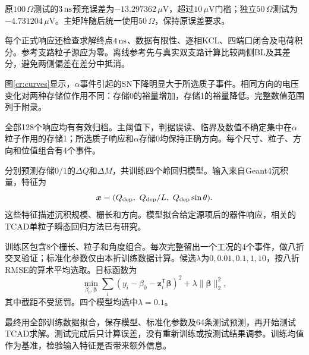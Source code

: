 \documentclass[UTF8,a4paper,zihao=-4,fontset=fandol]{ctexart}
\begin{document}
原$100\,\Omega$测试的$3\,\mathrm{ns}$预充误差为$-13.297362\,\mu\mathrm V$，超过$10\,\mu\mathrm V$门槛；独立$50\,\Omega$测试为$-4.731204\,\mu\mathrm V$。主矩阵随后统一使用$50\,\Omega$，保持原误差要求。

每个正式响应还检查求解终点$4\,\mathrm{ns}$、数据有限性、逐相KCL、四端口闭合及电荷积分。参考支路粒子源应为零。离线参考先与真实双支路计算比较两侧BL及其差分，避免两侧偏差在差分中抵消。

图\ref{cr:curves}显示，$\alpha$事件引起的SN下降明显大于所选质子事件。相同方向的电压变化对两种存储位作用不同：存储0的裕量增加，存储1的裕量降低。完整数值范围列于附录。

全部128个响应均有有效归档。主阈值下，判据误读、临界及数值不确定集中在$\alpha$粒子作用的存储1；所选质子响应和$\alpha$存储0均保持正确方向。每个尺寸、粒子、方向和位值组合有4个事件。

分别预测存储0/1的$\Delta Q$和$\Delta M$，共训练四个岭回归模型。输入来自Geant4沉积量，特征为
\begin{equation}\boldsymbol x=(Q_{\rm dep},\ Q_{\rm dep}/L,\ Q_{\rm dep}\sin\theta).
\end{equation}
这些特征描述沉积规模、栅长和方向。模型拟合给定源项后的器件响应，相关的TCAD单粒子瞬态回归方法已有研究\cite{xu2021}。

训练区包含8个栅长、粒子和角度组合。每次完整留出一个工况的4个事件，做八折交叉验证；标准化参数仅由本折训练数据计算。候选$\lambda$为$0,0.01,0.1,1,10$，按八折RMSE的算术平均选取。目标函数为
\begin{equation}\min_{\beta_0,\boldsymbol\beta}\sum_i(y_i-\beta_0-\boldsymbol z_i^\mathsf T\boldsymbol\beta)^2+\lambda\|\boldsymbol\beta\|_2^2,\end{equation}
其中截距不受惩罚。四个模型均选中$\lambda=0.1$。

最终用全部训练数据拟合，保存模型、标准化参数及64条测试预测，再开始测试TCAD求解。测试完成后只计算误差，没有重新训练或按测试结果调参。训练均值作为基准，检验输入特征是否带来额外信息。
\end{document}
